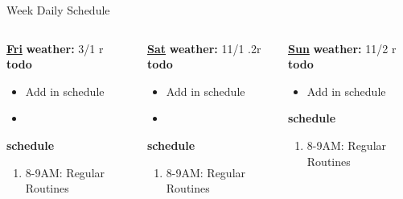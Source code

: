 \begin{columns}
\begin{column}{0.5\columnwidth}
\begin{columns}
\begin{column}{0.6\linewidth}
\begin{block}{Week Daily Schedule}
\begin{columns}
          \begin{column}{0.14\textwidth}{\small \underline{\bf Fri}}
            {\tiny \bf weather: } {\tiny 3/1 r} \\ 
            {\tiny \bf todo} \\ 
            \begin{itemize}
              \tiny \item \tiny Add in schedule
            \item \tiny 
            \end{itemize} 
                {\tiny \bf schedule} \\
                \begin{enumerate} 
                  \tiny \item \tiny 8-9AM: Regular Routines 
                \end{enumerate}
          \end{column}

          \begin{column}{0.15\textwidth}{\small \underline{\bf Sat}}
            {\tiny \bf weather: } {\tiny 11/1 .2r} \\ 
            { \tiny \bf todo} \\ 
            \begin{itemize}
              \tiny \item \tiny Add in schedule
            \item \tiny 
            \end{itemize} 
                {\tiny \bf schedule} \\
                \begin{enumerate} 
                  \tiny \item \tiny 8-9AM: Regular Routines 
                \end{enumerate}
          \end{column}
         
          \begin{column}{0.15\textwidth}{\small \underline{\bf Sun}}
            {\tiny {\bf weather:} } {\tiny 11/2 r} \\ 
            {\tiny {\bf todo}}\\
            \begin{itemize}
              \tiny \item \tiny Add in schedule
            \end{itemize} 
                {\tiny \bf schedule}\\
                \begin{enumerate} 
                  \tiny \item \tiny 8-9AM: Regular Routines 
                \end{enumerate}
          \end{column}
        \end{columns}
      \end{block}
\end{column}
    

\end{columns}
\end{column}
\end{columns}
